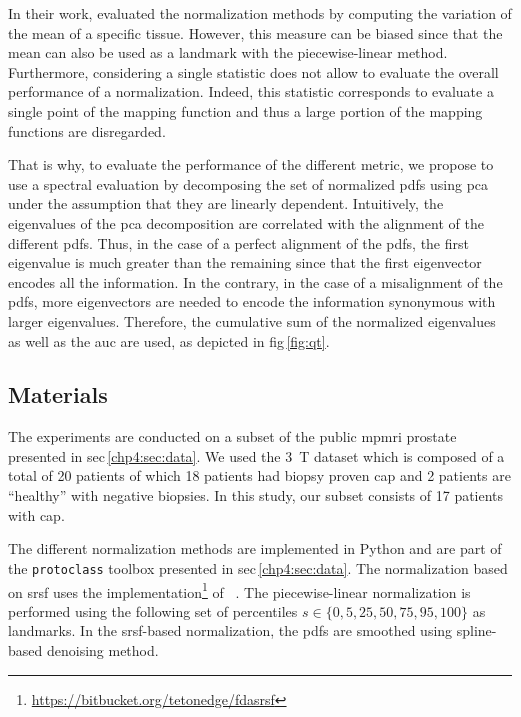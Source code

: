 In their work, \citeauthor{Nyul2000} evaluated the normalization methods by computing the variation of the mean of a specific tissue.
However, this measure can be biased since that the mean can also be used as a landmark with the piecewise-linear method.
Furthermore, considering a single statistic does not allow to evaluate the overall performance of a normalization.
Indeed, this statistic corresponds to evaluate a single point of the mapping function and thus a large portion of the mapping functions are disregarded. 

That is why, to evaluate the performance of the different metric, we propose to use a spectral evaluation by decomposing the set of normalized \ac{pdf}s using \ac{pca} under the assumption that they are linearly dependent. 
Intuitively, the eigenvalues of the \ac{pca} decomposition are correlated with the alignment of the different \acp{pdf}.
Thus, in the case of a perfect alignment of the \ac{pdf}s, the first eigenvalue is much greater than the remaining since that the first eigenvector encodes all the information.
In the contrary, in the case of a misalignment of the \ac{pdf}s, more eigenvectors are needed to encode the information synonymous with larger eigenvalues.
Therefore, the cumulative sum of the normalized eigenvalues as well as the \ac{auc} are used, as depicted in \acs{fig}\,\ref{fig:qt}.

\subsection{Materials}\label{subsec:chp5:T2-norm:Exp-res}

The experiments are conducted on a subset of the public \ac{mpmri} prostate presented in \acs{sec}\,\ref{chp4:sec:data}.
We used the \SI{3}{\tesla} dataset which is composed of a total of 20 patients of which 18 patients had biopsy proven \ac{cap} and 2 patients are ``healthy'' with negative biopsies. 
In this study, our subset consists of 17 patients with \ac{cap}.

The different normalization methods are implemented in Python and are part of the \texttt{protoclass} toolbox presented in \acs{sec}\,\ref{chp4:sec:data}.
The normalization based on \ac{srsf} uses the implementation\footnote{\url{https://bitbucket.org/tetonedge/fdasrsf}} of \citeauthor{Tucker2013}~\cite{Tucker2013}.
The piecewise-linear normalization is performed using the following set of percentiles $s \in \{0, 5, 25, 50, 75, 95, 100 \}$ as landmarks.
In the \ac{srsf}-based normalization, the \acp{pdf} are smoothed using spline-based denoising method.

